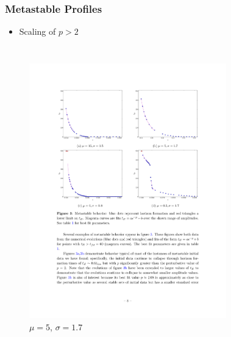 \documentclass[mathserif,10pt]{beamer}
\newcommand{\bi}{\begin{itemize}}
\newcommand{\ei}{\end{itemize}}
\newcommand{\its}{\item}
\begin{document}
{\frame
{
  \frametitle{Metastable Profiles}
  \bi
  \its Scaling of $p > 2$
  \ei
  \begin{columns}
    \begin{figure}
    \centering
    \includegraphics[scale=0.75]{m5w17} \\ $\mu = 5$, $\sigma = 1.7$
    \end{figure}
    \begin{figure}
    \centering

\end{figure}
\end{columns}}}
\end{document}
